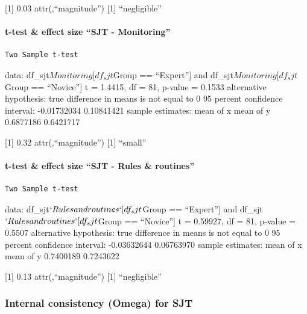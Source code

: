 \documentclass[
]{article}
\begin{document}
{[}1{]} 0.03 attr(,``magnitude'') {[}1{]} ``negligible''

\paragraph{t-test \& effect size ``SJT -
Monitoring''}\label{t-test-effect-size-sjt---monitoring}

\begin{verbatim}
Two Sample t-test
\end{verbatim}

data: df\_sjt\(Monitoring[df_sjt\)Group == ``Expert''{]} and
df\_sjt\(Monitoring[df_sjt\)Group == ``Novice''{]} t = 1.4415, df = 81,
p-value = 0.1533 alternative hypothesis: true difference in means is not
equal to 0 95 percent confidence interval: -0.01732034 0.10841421 sample
estimates: mean of x mean of y 0.6877186 0.6421717

{[}1{]} 0.32 attr(,``magnitude'') {[}1{]} ``small''

\paragraph{t-test \& effect size ``SJT - Rules \&
routines''}\label{t-test-effect-size-sjt---rules-routines}

\begin{verbatim}
Two Sample t-test
\end{verbatim}

data: df\_sjt\(`Rules and routines`[df_sjt\)Group == ``Expert''{]} and
df\_sjt\(`Rules and routines`[df_sjt\)Group == ``Novice''{]} t =
0.59927, df = 81, p-value = 0.5507 alternative hypothesis: true
difference in means is not equal to 0 95 percent confidence interval:
-0.03632644 0.06763970 sample estimates: mean of x mean of y 0.7400189
0.7243622

{[}1{]} 0.13 attr(,``magnitude'') {[}1{]} ``negligible''

\subsubsection{Internal consistency (Omega) for
SJT}\label{internal-consistency-omega-for-sjt}
\end{document}
